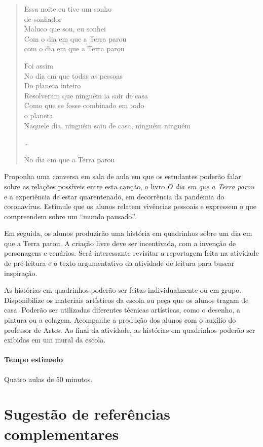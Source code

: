 \documentclass[11pt]{extarticle}
\begin{document}
\begin{verse}
Essa noite eu tive um sonho\\
de sonhador\\
Maluco que sou, eu sonhei\\
Com o dia em que a Terra parou\\
com o dia em que a Terra parou

Foi assim\\
No dia em que todas as pessoas\\
Do planeta inteiro\\
Resolveram que ninguém ia sair de casa\\
Como que se fosse combinado em todo\\
o planeta\\
Naquele dia, ninguém saiu de casa, ninguém ninguém

\ldots

No dia em que a Terra parou
\end{verse}

Proponha uma conversa em sala de aula em que os estudantes poderão falar sobre as relações possíveis entre esta canção, o livro \textit{O dia em que a Terra parou} e a experiência de estar quarentenado, em decorrência da pandemia do coronavírus. Estimule que os alunos relatem vivências pessoais e expressem o que compreendem sobre um ``mundo pausado''.

Em seguida, os alunos produzirão uma história em quadrinhos sobre um dia em que a Terra parou. A criação livre deve ser incentivada, com a invenção de personagens e cenários. Será interessante revisitar a reportagem feita na atividade de pré-leitura e o texto argumentativo da atividade de leitura para buscar inspiração. 

As histórias em quadrinhos poderão ser feitas individualmente ou em grupo. Disponibilize os materiais artísticos da escola ou peça que os alunos tragam de casa. Poderão ser utilizadas diferentes técnicas artísticas, como o desenho, a pintura ou a colagem. Acompanhe a produção dos alunos com o auxílio do professor de Artes. Ao final da atividade, as histórias em quadrinhos poderão ser exibidas em um mural da escola.

\paragraph{Tempo estimado} Quatro aulas de 50 minutos.

\section{Sugestão de referências complementares}
\end{document}
